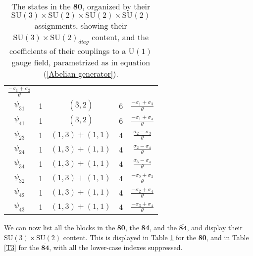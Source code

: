 \documentclass[a4paper,12pt,oneside]{article}
\begin{document}
\begin{table}
\begin{center}
\begin{tabular}{|c|c|c|c|c|}
$\frac{-\sigma_1+\sigma_2}{\theta}$ \\ 
$\psi_{31}$ & 1 & $(\bar{3},2)$ & 6 & 
$\frac{-\sigma_1+\sigma_3}{\theta}$ \\ 
$\psi_{41}$ & 1 & $(\bar{3},2)$ & 6 & 
$\frac{-\sigma_1+\sigma_4}{\theta}$ \\ \hline
$\psi_{23}$ & 1 & $(1,3)+(1,1)$ & 4 & 
$\frac{\sigma_2-\sigma_3}{\theta}$ \\ 
$\psi_{24}$ & 1 & $(1,3)+(1,1)$ & 4 & 
$\frac{\sigma_2-\sigma_4}{\theta}$ \\ 
$\psi_{34}$ & 1 & $(1,3)+(1,1)$ & 4 & 
$\frac{\sigma_3-\sigma_4}{\theta}$ \\ \hline
$\psi_{32}$ & 1 & $(1,3)+(1,1)$ & 4 & 
$\frac{-\sigma_2+\sigma_3}{\theta}$ \\ 
$\psi_{42}$ & 1 & $(1,3)+(1,1)$ & 4 & 
$\frac{-\sigma_2+\sigma_4}{\theta}$ \\ 
$\psi_{43}$ & 1 & $(1,3)+(1,1)$ & 4 & 
$\frac{-\sigma_3+\sigma_4}{\theta}$ \\ \hline
\end{tabular}
\caption{\label{T2}
The states in the \textbf{80}, organized by their
$\mathrm{SU}(3)\times\mathrm{SU}(2)\times\mathrm{SU}(2)\times
\mathrm{SU}(2)$ assignments, showing their $\mathrm{SU}(3)\times
\mathrm{SU}(2)_{diag}$ content, and the coefficients of
their couplings to a $\mathrm{U}(1)$ gauge field, parametrized as in equation (\ref{Abelian generator}).}
\end{center}
\end{table}

We can now list all the blocks in the \textbf{80}, the \textbf{84}, 
and the $\mathbf{\overline{84}}$, and display their $\mathrm{SU}(3)\times
\mathrm{SU}(2)$ content.  This is displayed in Table \ref{T2} for 
the \textbf{80}, and in Table \ref{T3} for the $\mathbf{\overline{84}}$,
with all the lower-case indexes suppressed.
\end{document}
